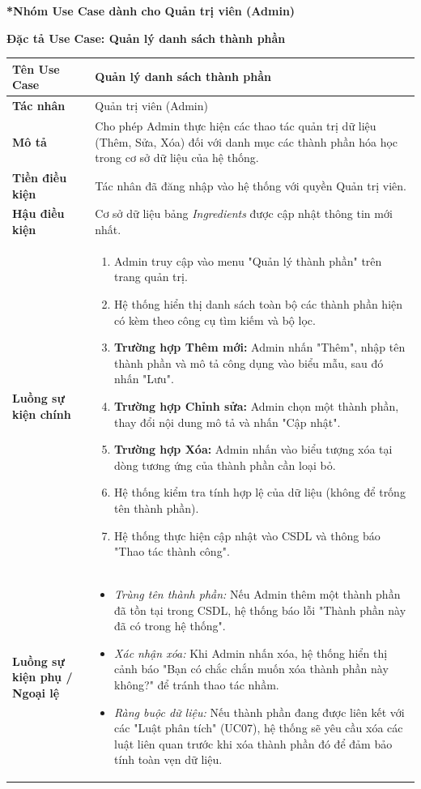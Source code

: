\documentclass[12pt,a4paper]{article}
\begin{document}
\textbf{*Nhóm Use Case dành cho Quản trị viên (Admin)}


\vspace{0.5cm}
\textbf{Đặc tả Use Case: Quản lý danh sách thành phần}

\begin{center}
\renewcommand{\arraystretch}{1.4}
\begin{tabular}{|p{4cm}|p{10cm}|}
\hline
\rowcolor{blue!15}
\textbf{Tên Use Case} & \textbf{Quản lý danh sách thành phần} \\ \hline
\textbf{Tác nhân} & Quản trị viên (Admin) \\ \hline
\textbf{Mô tả} & Cho phép Admin thực hiện các thao tác quản trị dữ liệu (Thêm, Sửa, Xóa) đối với danh mục các thành phần hóa học trong cơ sở dữ liệu của hệ thống. \\ \hline
\textbf{Tiền điều kiện} & Tác nhân đã đăng nhập vào hệ thống với quyền Quản trị viên. \\ \hline
\textbf{Hậu điều kiện} & Cơ sở dữ liệu bảng \textit{Ingredients} được cập nhật thông tin mới nhất. \\ \hline
\textbf{Luồng sự kiện chính} & 
\begin{enumerate}
    \item Admin truy cập vào menu "Quản lý thành phần" trên trang quản trị.
    \item Hệ thống hiển thị danh sách toàn bộ các thành phần hiện có kèm theo công cụ tìm kiếm và bộ lọc.
    \item \textbf{Trường hợp Thêm mới:} Admin nhấn "Thêm", nhập tên thành phần và mô tả công dụng vào biểu mẫu, sau đó nhấn "Lưu".
    \item \textbf{Trường hợp Chỉnh sửa:} Admin chọn một thành phần, thay đổi nội dung mô tả và nhấn "Cập nhật".
    \item \textbf{Trường hợp Xóa:} Admin nhấn vào biểu tượng xóa tại dòng tương ứng của thành phần cần loại bỏ.
    \item Hệ thống kiểm tra tính hợp lệ của dữ liệu (không để trống tên thành phần).
    \item Hệ thống thực hiện cập nhật vào CSDL và thông báo "Thao tác thành công".
\end{enumerate} \\ \hline
\textbf{Luồng sự kiện phụ / Ngoại lệ} & 
\begin{itemize}
    \item \textit{Trùng tên thành phần:} Nếu Admin thêm một thành phần đã tồn tại trong CSDL, hệ thống báo lỗi "Thành phần này đã có trong hệ thống".
    \item \textit{Xác nhận xóa:} Khi Admin nhấn xóa, hệ thống hiển thị cảnh báo "Bạn có chắc chắn muốn xóa thành phần này không?" để tránh thao tác nhầm.
    \item \textit{Ràng buộc dữ liệu:} Nếu thành phần đang được liên kết với các "Luật phân tích" (UC07), hệ thống sẽ yêu cầu xóa các luật liên quan trước khi xóa thành phần đó để đảm bảo tính toàn vẹn dữ liệu.
\end{itemize} \\ \hline
\end{tabular}
\end{center}
\end{document}
